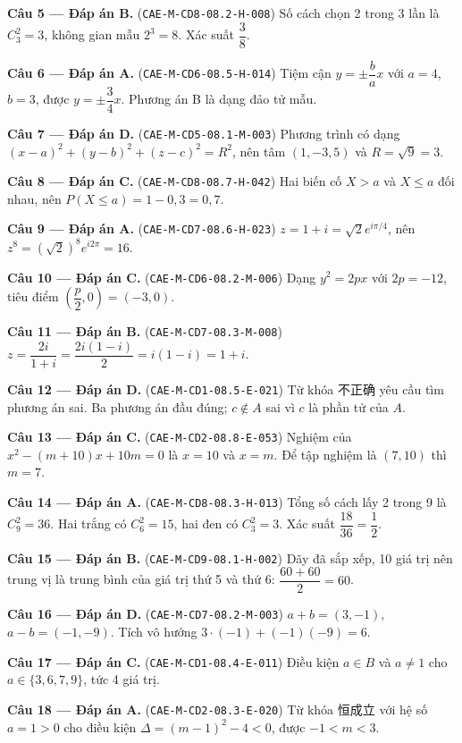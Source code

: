 \documentclass[11pt, a4paper]{article}
\begin{document}
\textbf{Câu 5 — Đáp án B.} (\texttt{CAE-M-CD8-08.2-H-008}) Số cách chọn 2 trong 3 lần là $C_3^2 = 3$, không gian mẫu $2^3 = 8$. Xác suất $\dfrac{3}{8}$.

\textbf{Câu 6 — Đáp án A.} (\texttt{CAE-M-CD6-08.5-H-014}) Tiệm cận $y = \pm\dfrac{b}{a}x$ với $a = 4$, $b = 3$, được $y = \pm\dfrac{3}{4}x$. Phương án B là dạng đảo tử mẫu.

\textbf{Câu 7 — Đáp án D.} (\texttt{CAE-M-CD5-08.1-M-003}) Phương trình có dạng $(x-a)^2 + (y-b)^2 + (z-c)^2 = R^2$, nên tâm $(1, -3, 5)$ và $R = \sqrt{9} = 3$.

\textbf{Câu 8 — Đáp án C.} (\texttt{CAE-M-CD8-08.7-H-042}) Hai biến cố $X > a$ và $X \le a$ đối nhau, nên $P(X \le a) = 1 - 0,3 = 0,7$.

\textbf{Câu 9 — Đáp án A.} (\texttt{CAE-M-CD7-08.6-H-023}) $z = 1 + i = \sqrt{2}e^{i\pi/4}$, nên $z^8 = (\sqrt{2})^8 e^{i2\pi} = 16$.

\textbf{Câu 10 — Đáp án C.} (\texttt{CAE-M-CD6-08.2-M-006}) Dạng $y^2 = 2px$ với $2p = -12$, tiêu điểm $\left(\dfrac{p}{2}, 0\right) = (-3, 0)$.

\textbf{Câu 11 — Đáp án B.} (\texttt{CAE-M-CD7-08.3-M-008}) $z = \dfrac{2i}{1+i} = \dfrac{2i(1-i)}{2} = i(1-i) = 1 + i$.

\textbf{Câu 12 — Đáp án D.} (\texttt{CAE-M-CD1-08.5-E-021}) Từ khóa 不正确 yêu cầu tìm phương án sai. Ba phương án đầu đúng; $c \notin A$ sai vì $c$ là phần tử của $A$.

\textbf{Câu 13 — Đáp án C.} (\texttt{CAE-M-CD2-08.8-E-053}) Nghiệm của $x^2 - (m+10)x + 10m = 0$ là $x = 10$ và $x = m$. Để tập nghiệm là $(7, 10)$ thì $m = 7$.

\textbf{Câu 14 — Đáp án A.} (\texttt{CAE-M-CD8-08.3-H-013}) Tổng số cách lấy 2 trong 9 là $C_9^2 = 36$. Hai trắng có $C_6^2 = 15$, hai đen có $C_3^2 = 3$. Xác suất $\dfrac{18}{36} = \dfrac{1}{2}$.

\textbf{Câu 15 — Đáp án B.} (\texttt{CAE-M-CD9-08.1-H-002}) Dãy đã sắp xếp, 10 giá trị nên trung vị là trung bình của giá trị thứ 5 và thứ 6: $\dfrac{60 + 60}{2} = 60$.

\textbf{Câu 16 — Đáp án D.} (\texttt{CAE-M-CD7-08.2-M-003}) $a + b = (3, -1)$, $a - b = (-1, -9)$. Tích vô hướng $3 \cdot (-1) + (-1)(-9) = 6$.

\textbf{Câu 17 — Đáp án C.} (\texttt{CAE-M-CD1-08.4-E-011}) Điều kiện $a \in B$ và $a \ne 1$ cho $a \in \{3, 6, 7, 9\}$, tức 4 giá trị.

\textbf{Câu 18 — Đáp án A.} (\texttt{CAE-M-CD2-08.3-E-020}) Từ khóa 恒成立 với hệ số $a = 1 > 0$ cho điều kiện $\Delta = (m-1)^2 - 4 < 0$, được $-1 < m < 3$.
\end{document}
